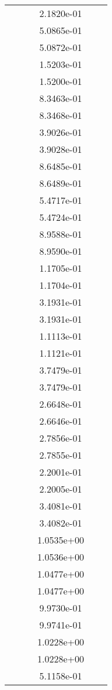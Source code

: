 \begin{xltabular}{\textwidth}{r|rS[table-format=1.3e+2]S[table-format=1.4e+2]S[table-format=1.4e+2]S[table-format=-1.5]}
&  &  & 2.1820e-01 & & \\
&  &  & 5.0865e-01 & & \\
&  &  & 5.0872e-01 & & \\
&  &  & 1.5203e-01 & & \\
&  &  & 1.5200e-01 & & \\
&  &  & 8.3463e-01 & & \\
&  &  & 8.3468e-01 & & \\
&  &  & 3.9026e-01 & & \\
&  &  & 3.9028e-01 & & \\
&  &  & 8.6485e-01 & & \\
&  &  & 8.6489e-01 & & \\
&  &  & 5.4717e-01 & & \\
&  &  & 5.4724e-01 & & \\
&  &  & 8.9588e-01 & & \\
&  &  & 8.9590e-01 & & \\
&  &  & 1.1705e-01 & & \\
&  &  & 1.1704e-01 & & \\
&  &  & 3.1931e-01 & & \\
&  &  & 3.1931e-01 & & \\
&  &  & 1.1113e-01 & & \\
&  &  & 1.1121e-01 & & \\
&  &  & 3.7479e-01 & & \\
&  &  & 3.7479e-01 & & \\
&  &  & 2.6648e-01 & & \\
&  &  & 2.6646e-01 & & \\
&  &  & 2.7856e-01 & & \\
&  &  & 2.7855e-01 & & \\
&  &  & 2.2001e-01 & & \\
&  &  & 2.2005e-01 & & \\
&  &  & 3.4081e-01 & & \\
&  &  & 3.4082e-01 & & \\
&  &  & 1.0535e+00 & & \\
&  &  & 1.0536e+00 & & \\
&  &  & 1.0477e+00 & & \\
&  &  & 1.0477e+00 & & \\
&  &  & 9.9730e-01 & & \\
&  &  & 9.9741e-01 & & \\
&  &  & 1.0228e+00 & & \\
&  &  & 1.0228e+00 & & \\
&  &  & 5.1158e-01 & & \\

\end{xltabular}
